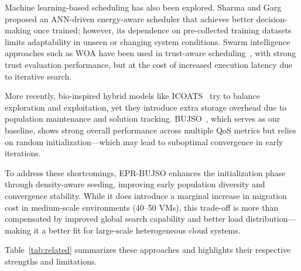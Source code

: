 \documentclass[journal]{IEEEtran}
\begin{document}
Machine learning-based scheduling has also been explored. Sharma and Garg~\cite{sharma2020} proposed an ANN-driven energy-aware scheduler that achieves better decision-making once trained; however, its dependence on pre-collected training datasets limits adaptability in unseen or changing system conditions. Swarm intelligence approaches such as WOA have been used in trust-aware scheduling~\cite{mangalampalli2023}, with strong trust evaluation performance, but at the cost of increased execution latency due to iterative search.

More recently, bio-inspired hybrid models like ICOATS~\cite{tamilarasu2023} try to balance exploration and exploitation, yet they introduce extra storage overhead due to population maintenance and solution tracking. BUJSO~\cite{pachipala2024}, which serves as our baseline, shows strong overall performance across multiple QoS metrics but relies on random initialization---which may lead to suboptimal convergence in early iterations.

To address these shortcomings, EPR-BUJSO enhances the initialization phase through density-aware seeding, improving early population diversity and convergence stability. While it does introduce a marginal increase in migration cost in medium-scale environments (40--50 VMs), this trade-off is more than compensated by improved global search capability and better load distribution---making it a better fit for large-scale heterogeneous cloud systems.

Table~\ref{tab:related} summarizes these approaches and highlights their respective strengths and limitations.
\end{document}
